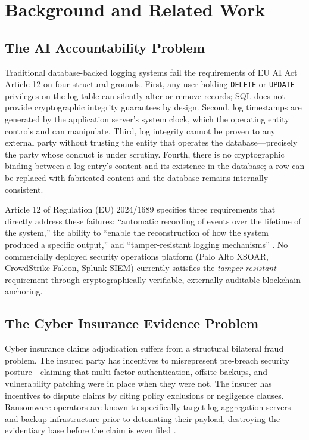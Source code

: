 \documentclass[12pt,a4paper]{article}
\begin{document}
\section{Background and Related Work}
\label{sec:background}

\subsection{The AI Accountability Problem}
\label{sec:ai-accountability}

Traditional database-backed logging systems fail the requirements of
EU AI Act Article 12 on four structural grounds. First, any user holding
\texttt{DELETE} or \texttt{UPDATE} privileges on the log table can silently
alter or remove records; SQL does not provide cryptographic integrity
guarantees by design. Second, log timestamps are generated by the
application server's system clock, which the operating entity controls
and can manipulate. Third, log integrity cannot be proven to any external
party without trusting the entity that operates the database---precisely
the party whose conduct is under scrutiny. Fourth, there is no
cryptographic binding between a log entry's content and its existence in
the database; a row can be replaced with fabricated content and the
database remains internally consistent.

Article 12 of Regulation (EU) 2024/1689 specifies three requirements
that directly address these failures: ``automatic recording of events
over the lifetime of the system,'' the ability to ``enable the
reconstruction of how the system produced a specific output,'' and
``tamper-resistant logging mechanisms'' \cite{euaiact2024}. No
commercially deployed security operations platform (Palo Alto XSOAR,
CrowdStrike Falcon, Splunk SIEM) currently satisfies the
\emph{tamper-resistant} requirement through cryptographically verifiable,
externally auditable blockchain anchoring.

\subsection{The Cyber Insurance Evidence Problem}
\label{sec:insurance-problem}

Cyber insurance claims adjudication suffers from a structural bilateral
fraud problem. The insured party has incentives to misrepresent pre-breach
security posture---claiming that multi-factor authentication, offsite
backups, and vulnerability patching were in place when they were not.
The insurer has incentives to dispute claims by citing policy exclusions
or negligence clauses. Ransomware operators are known to specifically
target log aggregation servers and backup infrastructure prior to
detonating their payload, destroying the evidentiary base before the
claim is even filed \cite{ransomware2023}.
\end{document}
